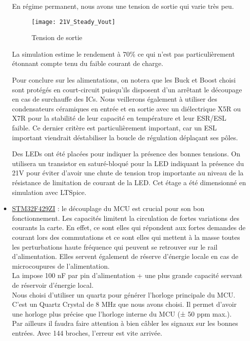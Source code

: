 \begin{itemize}
	      En régime permanent, nous avons une tension de sortie qui varie très peu.
	      	                  
	      \begin{figure}[H]
	      	\begin{center}
	      		\texttt{[image: 21V\_Steady\_Vout]}
	      	\end{center}
	      	\caption{Tension de sortie}
	      \end{figure}
	      	                  
	      La simulation estime le rendement à 70\% ce qui n'est pas particulièrement étonnant compte tenu du faible courant de charge.
          
	      Pour conclure sur les alimentations, on notera que les Buck et Boost choisi sont protégés en court-circuit puisqu'ils disposent d'un  arrêtant le découpage en cas de surchauffe des ICs.
	      Nous veillerons également à utiliser des condensateurs céramiques en entrée et en sortie avec un diélectrique X5R ou X7R pour la stabilité de leur capacité en température et leur \gls{ESR}/\gls{ESL} faible.
	      Ce dernier critère est particulièrement important, car un \gls{ESL} important viendrait déstabiliser la boucle de régulation déplaçant ses pôles.
	      	                  
	      Des LEDs ont été placées pour indiquer la présence des bonnes tensions.
	      On utilisera un transistor en saturé-bloqué pour la LED indiquant la présence du 21V pour éviter d'avoir une chute de tension trop importante au niveau de la résistance de limitation de courant de la LED.
	      Cet étage a été dimensionné en simulation avec LTSpice.
	      	                  
	\item \hyperlink{Schematic.3}{STM32F429ZI} :
	      le découplage du MCU est crucial pour son bon fonctionnement. 
	      Les capacités limitent la circulation de fortes variations des courants la carte. 
	      En effet, ce sont elles qui répondent aux fortes demandes de courant lors des commutations et ce sont elles qui mettent à la masse toutes les perturbations haute fréquence qui peuvent se retrouver sur le rail d'alimentation.
	      Elles servent également de réserve d'énergie locale en cas de microcoupures de l'alimentation. \\
	      La  impose 100 nF par pin d'alimentation + une plus grande capacité servant de réservoir d'énergie local. \\
	      Nous choisi d'utiliser un quartz pour générer l'horloge principale du MCU.
	      C'est un Quartz Crystal de 8 MHz que nous avons choisi.
	      Il permet d'avoir une horloge plus précise que l'horloge interne du MCU (± 50 ppm max.).\\
	      Par ailleurs il faudra faire attention à bien câbler les signaux sur les bonnes entrées.
	      Avec 144 broches, l'erreur est vite arrivée.\\
	      	                  

\end{itemize}
